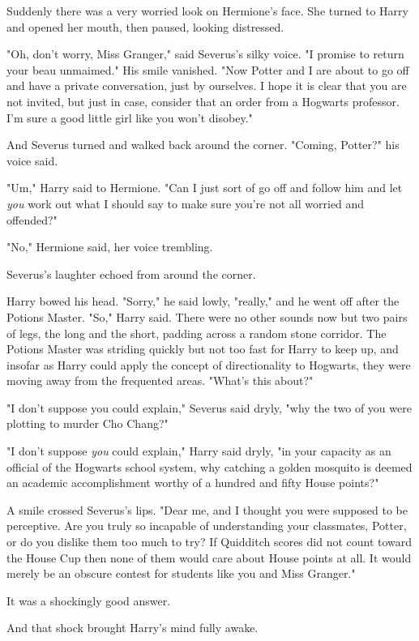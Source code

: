 Suddenly there was a very worried look on Hermione's face. She turned to Harry
and opened her mouth, then paused, looking distressed.

"Oh, don't worry, Miss Granger," said Severus's silky voice. "I promise to
return your beau unmaimed." His smile vanished. "Now Potter and I are about to
go off and have a private conversation, just by ourselves. I hope it is clear
that you are not invited, but just in case, consider that an order from a
Hogwarts professor. I'm sure a good little girl like you won't disobey."

And Severus turned and walked back around the corner. "Coming, Potter?" his
voice said.

"Um," Harry said to Hermione. "Can I just sort of go off and follow him and let
\emph{you} work out what I should say to make sure you're not all worried and
offended?"

"No," Hermione said, her voice trembling.

Severus's laughter echoed from around the corner.

Harry bowed his head. "Sorry," he said lowly, "really," and he went off after
the Potions Master.
\sbreak
"So," Harry said. There were no other sounds now but two pairs of legs, the
long and the short, padding across a random stone corridor. The Potions Master
was striding quickly but not too fast for Harry to keep up, and insofar as
Harry could apply the concept of directionality to Hogwarts, they were moving
away from the frequented areas. "What's this about?"

"I don't suppose you could explain," Severus said dryly, "why the two of you
were plotting to murder Cho Chang?"

"I don't suppose \emph{you} could explain," Harry said dryly, "in your capacity
as an official of the Hogwarts school system, why catching a golden mosquito is
deemed an academic accomplishment worthy of a hundred and fifty House points?"

A smile crossed Severus's lips. "Dear me, and I thought you were supposed to be
perceptive. Are you truly so incapable of understanding your classmates,
Potter, or do you dislike them too much to try? If Quidditch scores did not
count toward the House Cup then none of them would care about House points at
all. It would merely be an obscure contest for students like you and Miss
Granger."

It was a shockingly good answer.

And that shock brought Harry's mind fully awake.

